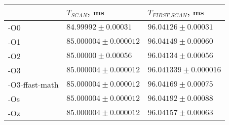 \begin{tabular}{lll}
\toprule
 & $T_{SCAN}$, ms & $T_{FIRST\_SCAN}$, ms \\
\midrule
-O0 & $84.99992 \pm 0.00031$ & $96.04126 \pm 0.00031$ \\
-O1 & $85.000004 \pm 0.000012$ & $96.04149 \pm 0.00060$ \\
-O2 & $85.00000 \pm 0.00056$ & $96.04134 \pm 0.00056$ \\
-O3 & $85.000004 \pm 0.000012$ & $96.041339 \pm 0.000016$ \\
-O3-ffast-math & $85.000004 \pm 0.000012$ & $96.04169 \pm 0.00075$ \\
-Os & $85.000004 \pm 0.000012$ & $96.04192 \pm 0.00088$ \\
-Oz & $85.000004 \pm 0.000012$ & $96.04157 \pm 0.00063$ \\
\bottomrule
\end{tabular}

